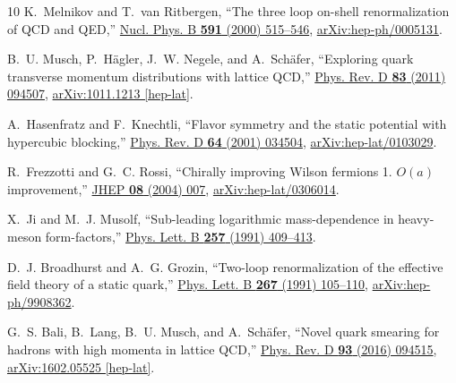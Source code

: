 \begin{thebibliography}{10}
K.~Melnikov and T.~van Ritbergen, ``The three loop on-shell renormalization of
  {QCD and QED},'' \href{http://dx.doi.org/10.1016/S0550-3213(00)00526-5}{Nucl.
  Phys. B {\bfseries 591} (2000) 515--546},
\href{http://arxiv.org/abs/hep-ph/0005131}{{\ttfamily arXiv:hep-ph/0005131}}.

B.~U. Musch, P.~Hägler, J.~W. Negele, and A.~Schäfer, ``{Exploring quark
  transverse momentum distributions with lattice QCD},''
  \href{http://dx.doi.org/10.1103/PhysRevD.83.094507}{Phys. Rev. D {\bfseries
  83} (2011) 094507},
\href{http://arxiv.org/abs/1011.1213}{{\ttfamily arXiv:1011.1213 [hep-lat]}}.

A.~Hasenfratz and F.~Knechtli, ``{Flavor symmetry and the static potential with
  hypercubic blocking},''
  \href{http://dx.doi.org/10.1103/PhysRevD.64.034504}{Phys. Rev. D {\bfseries
  64} (2001) 034504},
\href{http://arxiv.org/abs/hep-lat/0103029}{{\ttfamily arXiv:hep-lat/0103029}}.

R.~Frezzotti and G.~C. Rossi, ``{Chirally improving Wilson fermions 1. $O(a)$
  improvement},'' \href{http://dx.doi.org/10.1088/1126-6708/2004/08/007}{JHEP
  {\bfseries 08} (2004) 007},
\href{http://arxiv.org/abs/hep-lat/0306014}{{\ttfamily arXiv:hep-lat/0306014}}.

X.~Ji and M.~J. Musolf, ``{Sub-leading logarithmic mass-dependence in
  heavy-meson form-factors},''
\href{http://dx.doi.org/10.1016/0370-2693(91)91916-J}{Phys. Lett. B {\bfseries
  257} (1991) 409--413}.

D.~J. Broadhurst and A.~G. Grozin, ``{Two-loop renormalization of the effective
  field theory of a static quark},''
  \href{http://dx.doi.org/10.1016/0370-2693(91)90532-U}{Phys. Lett. B
  {\bfseries 267} (1991) 105--110},
\href{http://arxiv.org/abs/hep-ph/9908362}{{\ttfamily arXiv:hep-ph/9908362}}.

G.~S. Bali, B.~Lang, B.~U. Musch, and A.~Schäfer, ``{Novel quark smearing for
  hadrons with high momenta in lattice QCD},''
  \href{http://dx.doi.org/10.1103/PhysRevD.93.094515}{Phys. Rev. D {\bfseries
  93} (2016) 094515},
\href{http://arxiv.org/abs/1602.05525}{{\ttfamily arXiv:1602.05525 [hep-lat]}}.


\end{thebibliography}
